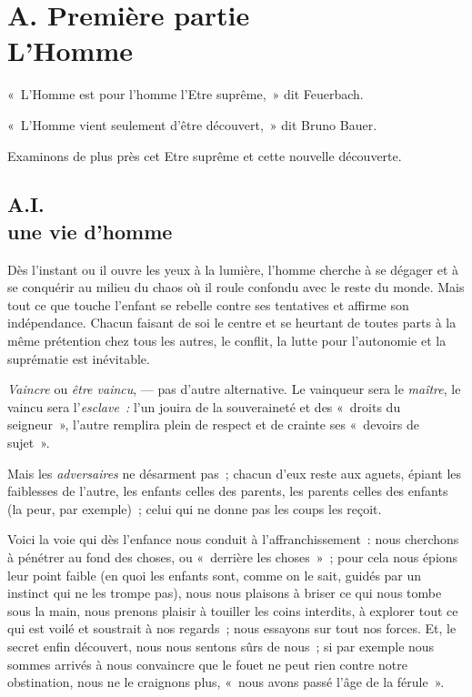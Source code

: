 \documentclass[french,twoside]{book} %
\begin{document}
 \section[{A. Première partie. L’Homme}]{A. Première partie \\
L’Homme}\renewcommand{\leftmark}{A. Première partie \\
L’Homme}

 \noindent « L’Homme est pour l’homme l’Etre suprême, » dit Feuerbach.\par
« L’Homme vient seulement d’être découvert, » dit Bruno Bauer.\par
Examinons de plus près cet Etre suprême et cette nouvelle découverte.\par
 \subsection[{A.I. une vie d’homme}]{A.I. \\
une vie d’homme}
\noindent Dès l’instant ou il ouvre les yeux à la lumière, l’homme cherche à se dégager et à se conquérir au milieu du chaos où il roule confondu avec le reste du monde. Mais tout ce que touche l’enfant se rebelle contre ses tentatives et affirme son indépendance. Chacun faisant de soi le centre et se heurtant de toutes parts à la même prétention chez tous les autres, le conflit, la lutte pour l’autonomie et la suprématie est inévitable.\par
\emph{Vaincre} ou \emph{être vaincu}, — pas d’autre alternative. Le vainqueur sera le \emph{maître}, le vaincu sera l’\emph{esclave : }l’un jouira de la souveraineté et des « droits du seigneur », l’autre remplira plein de respect et de crainte ses « devoirs de sujet ».\par
Mais les \emph{adversaires} ne désarment pas ; chacun d’eux reste aux aguets, épiant les faiblesses de l’autre, les enfants celles des parents, les parents celles des enfants (la peur, par exemple) ; celui qui ne donne pas les coups les reçoit.\par
Voici la voie qui dès l’enfance nous conduit à l’affranchissement : nous cherchons à pénétrer au fond des choses, ou « derrière les choses » ; pour cela nous épions leur point faible (en quoi les enfants sont, comme on le sait, guidés par un instinct qui ne  les trompe pas), nous nous plaisons à briser ce qui nous tombe sous la main, nous prenons plaisir à touiller les coins interdits, à explorer tout ce qui est voilé et soustrait à nos regards ; nous essayons sur tout nos forces. Et, le secret enfin découvert, nous nous sentons sûrs de nous ; si par exemple nous sommes arrivés à nous convaincre que le fouet ne peut rien contre notre obstination, nous ne le craignons plus, « nous avons passé l’âge de la férule ».\par
\end{document}
